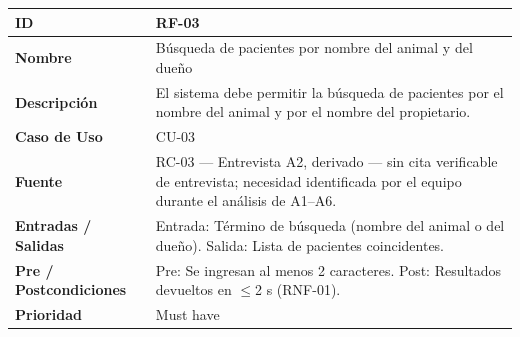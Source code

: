 \documentclass[
]{article}
\newcounter{none} %
\begin{document}
{\def\LTcaptype{none} %
\begin{longtable}[]{|
  >{\raggedright\arraybackslash}p{}|
  >{\raggedright\arraybackslash}p{}|}
\hline
\begin{minipage}[b]{\linewidth}\raggedright
\textbf{ID}
\end{minipage} & \begin{minipage}[b]{\linewidth}\raggedright
RF-03
\end{minipage} \\
\hline
\endhead
\hline
\endlastfoot
\textbf{Nombre} & \begin{minipage}[t]{\linewidth}\raggedright
Búsqueda de pacientes por nombre del animal y del dueño
\end{minipage} \\
\hline
\textbf{Descripción} & \begin{minipage}[t]{\linewidth}\raggedright
El sistema debe permitir la búsqueda de pacientes por el nombre del animal y por el nombre del propietario.
\end{minipage} \\
\hline
\textbf{Caso de Uso} & \begin{minipage}[t]{\linewidth}\raggedright
CU-03
\end{minipage} \\
\hline
\textbf{Fuente} & \begin{minipage}[t]{\linewidth}\raggedright
RC-03 — Entrevista A2, derivado — sin cita verificable de entrevista; necesidad identificada por el equipo durante el análisis de A1–A6.
\end{minipage} \\
\hline
\textbf{Entradas / Salidas} & \begin{minipage}[t]{\linewidth}\raggedright
Entrada: Término de búsqueda (nombre del animal o del dueño). Salida: Lista de pacientes coincidentes.
\end{minipage} \\
\hline
\textbf{Pre / Postcondiciones} & \begin{minipage}[t]{\linewidth}\raggedright
Pre: Se ingresan al menos 2 caracteres. Post: Resultados devueltos en $\leq$2 s (RNF-01).
\end{minipage} \\
\hline
\textbf{Prioridad} & \begin{minipage}[t]{\linewidth}\raggedright
Must have
\end{minipage} \\

\end{longtable}}
\end{document}
